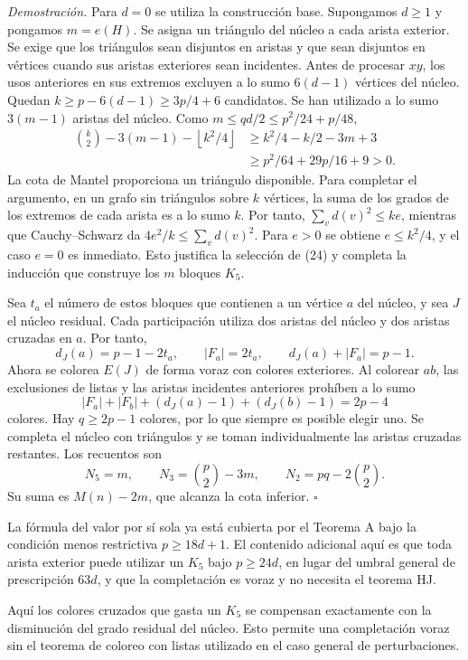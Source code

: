 \documentclass[spanish,11pt,a4paper]{article}
\begin{document}
\emph{Demostración.} Para \(d=0\) se utiliza la construcción base.
Supongamos \(d\ge1\) y pongamos \(m=e(H)\). Se asigna un triángulo del
núcleo a cada arista exterior. Se exige que los triángulos sean
disjuntos en aristas y que sean disjuntos en vértices cuando sus aristas
exteriores sean incidentes. Antes de procesar \(xy\), los usos
anteriores en sus extremos excluyen a lo sumo \(6(d-1)\) vértices del
núcleo. Quedan \(k\ge p-6(d-1)\ge3p/4+6\) candidatos. Se han utilizado a
lo sumo \(3(m-1)\) aristas del núcleo. Como
\(m\le qd/2\le p^2/24+p/48\), \[
\begin{aligned}
\binom k2-3(m-1)-\left\lfloor k^2/4\right\rfloor
&\ge k^2/4-k/2-3m+3\\
&\ge p^2/64+29p/16+9>0.
\end{aligned} \tag{24}
\] La cota de Mantel proporciona un triángulo disponible. Para completar
el argumento, en un grafo sin triángulos sobre \(k\) vértices, la suma
de los grados de los extremos de cada arista es a lo sumo \(k\). Por
tanto, \(\sum_v d(v)^2\le ke\), mientras que Cauchy--Schwarz da
\(4e^2/k\le\sum_v d(v)^2\). Para \(e>0\) se obtiene \(e\le k^2/4\), y el
caso \(e=0\) es inmediato. Esto justifica la selección de (24) y
completa la inducción que construye los \(m\) bloques \(K_5\).

Sea \(t_a\) el número de estos bloques que contienen a un vértice \(a\)
del núcleo, y sea \(J\) el núcleo residual. Cada participación utiliza
dos aristas del núcleo y dos aristas cruzadas en \(a\). Por tanto, \[
d_J(a)=p-1-2t_a,\qquad |F_a|=2t_a,
\qquad d_J(a)+|F_a|=p-1. \tag{25}
\] Ahora se colorea \(E(J)\) de forma voraz con colores exteriores. Al
colorear \(ab\), las exclusiones de listas y las aristas incidentes
anteriores prohíben a lo sumo \[
|F_a|+|F_b|+(d_J(a)-1)+(d_J(b)-1)=2p-4
\] colores. Hay \(q\ge2p-1\) colores, por lo que siempre es posible
elegir uno. Se completa el núcleo con triángulos y se toman
individualmente las aristas cruzadas restantes. Los recuentos son \[
N_5=m,\qquad N_3=\binom p2-3m,\qquad N_2=pq-2\binom p2.
\] Su suma es \(M(n)-2m\), que alcanza la cota inferior. \(\square\)

La fórmula del valor por sí sola ya está cubierta por el Teorema A bajo
la condición menos restrictiva \(p\ge18d+1\). El contenido adicional
aquí es que toda arista exterior puede utilizar un \(K_5\) bajo
\(p\ge24d\), en lugar del umbral general de prescripción \(63d\), y que
la completación es voraz y no necesita el teorema HJ.

Aquí los colores cruzados que gasta un \(K_5\) se compensan exactamente
con la disminución del grado residual del núcleo. Esto permite una
completación voraz sin el teorema de coloreo con listas utilizado en el
caso general de perturbaciones.
\end{document}
